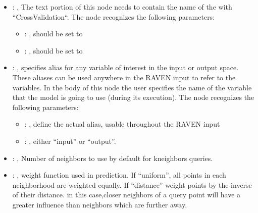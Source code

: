 \begin{itemize}
\begin{itemize}
        \item {}: ,
          List of IDs of features/variables to include in the transformation process.

        \item {}: ,
          Which space to search? Target or Feature?
      \end{itemize}

    \item {}: ,
      The text portion of this node needs to contain the name of the  with
               ``CrossValidation``.
      The  node recognizes the following parameters:
        \begin{itemize}
          \item {}: ,
            should be set to 
          \item {}: ,
            should be set to 
      \end{itemize}

    \item {}: ,
      specifies alias for         any variable of interest in the input or output space. These
      aliases can be used anywhere in the RAVEN input to         refer to the variables. In the body
      of this node the user specifies the name of the variable that the model is going to use
      (during its execution).
      The  node recognizes the following parameters:
        \begin{itemize}
          \item {}: ,
            define the actual alias, usable throughout the RAVEN input
          \item {}: ,
            either ``input'' or ``output''.
      \end{itemize}

    \item {}: ,
      Number of neighbors to use by default for kneighbors queries.

    \item {}: ,
      weight function used in prediction. If ``uniform'', all points in each neighborhood
      are weighted equally. If ``distance'' weight points by the inverse of their distance. in this
      case,closer neighbors of a query point will have a greater influence than neighbors which are
      further away.


\end{itemize}

